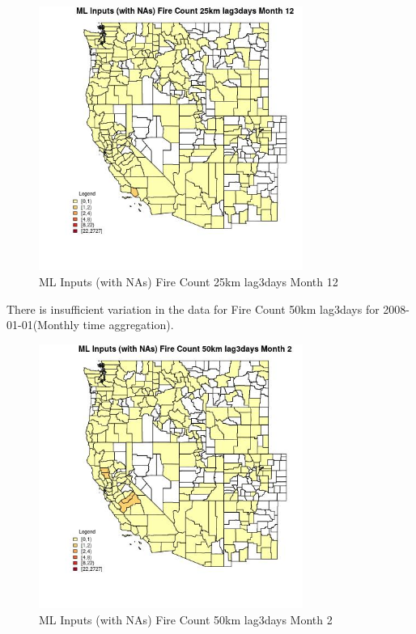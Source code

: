 \begin{figure} 
\centering  
\includegraphics[width=0.77\textwidth]{Code_Outputs/Report_ML_input_PM25_Step4_part_f_de_duplicated_aveswNAs_CountyFire_Count_25km_lag3daysmedianMonth12.jpg} 
\caption{\label{fig:Report_ML_input_PM25_Step4_part_f_de_duplicated_aveswNAsCountyFire_Count_25km_lag3daysmedianMonth12}ML Inputs (with NAs) Fire Count 25km lag3days Month 12} 
\end{figure} 
 

There is insufficient variation in the data for Fire Count 50km lag3days for 2008-01-01(Monthly time aggregation). 
 

\begin{figure} 
\centering  
\includegraphics[width=0.77\textwidth]{Code_Outputs/Report_ML_input_PM25_Step4_part_f_de_duplicated_aveswNAs_CountyFire_Count_50km_lag3daysmedianMonth2.jpg} 
\caption{\label{fig:Report_ML_input_PM25_Step4_part_f_de_duplicated_aveswNAsCountyFire_Count_50km_lag3daysmedianMonth2}ML Inputs (with NAs) Fire Count 50km lag3days Month 2} 
\end{figure} 
 

